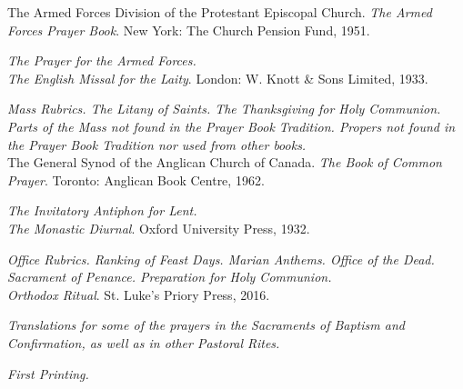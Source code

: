 \clearpage
\thispagestyle{copyrightpagee}

The Armed Forces Division of the Protestant Episcopal Church. \textit{The Armed Forces Prayer Book}. New York: The Church Pension Fund, 1951.\par\noindent
\textit{The Prayer for the Armed Forces.}\\

\textit{The English Missal for the Laity}. London: W. Knott \& Sons Limited, 1933.\par\noindent
\textit{Mass Rubrics. The Litany of Saints. The Thanksgiving for Holy Communion. Parts of the Mass not found in the Prayer Book Tradition. Propers not found in the Prayer Book Tradition nor used from other books.}\\

The General Synod of the Anglican Church of Canada. \textit{The Book of Common Prayer}. Toronto: Anglican Book Centre, 1962.\par\noindent
\textit{The Invitatory Antiphon for Lent.}\\

\textit{The Monastic Diurnal}. Oxford University Press, 1932.\par\noindent
\textit{Office Rubrics. Ranking of Feast Days. Marian Anthems. Office of the Dead. Sacrament of Penance. Preparation for Holy Communion.}\\

\textit{Orthodox Ritual}. St. Luke's Priory Press, 2016.\par\noindent
\textit{Translations for some of the prayers in the Sacraments of Baptism and Confirmation, as well as in other Pastoral Rites.}

\vfill
\par\noindent
  \centerline{\emph{First Printing.}}

